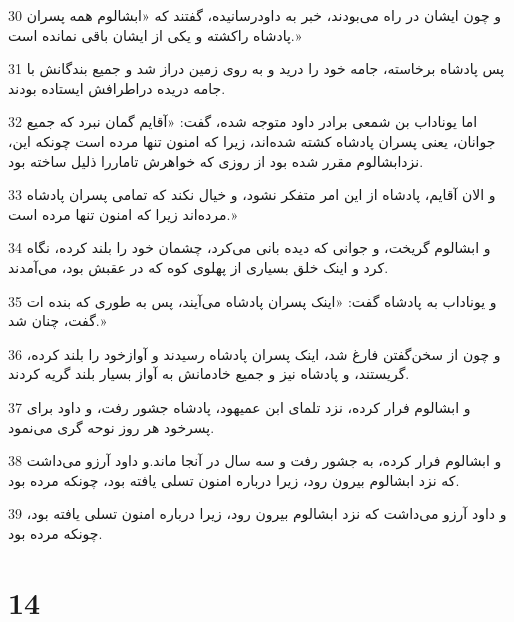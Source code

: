 \par 30 و چون ایشان در راه می‌بودند، خبر به داودرسانیده، گفتند که «ابشالوم همه پسران پادشاه راکشته و یکی از ایشان باقی نمانده است.»
\par 31 پس پادشاه برخاسته، جامه خود را درید و به روی زمین دراز شد و جمیع بندگانش با جامه دریده دراطرافش ایستاده بودند.
\par 32 اما یوناداب بن شمعی برادر داود متوجه شده، گفت: «آقایم گمان نبرد که جمیع جوانان، یعنی پسران پادشاه کشته شده‌اند، زیرا که امنون تنها مرده است چونکه این، نزدابشالوم مقرر شده بود از روزی که خواهرش تاماررا ذلیل ساخته بود.
\par 33 و الان آقایم، پادشاه از این امر متفکر نشود، و خیال نکند که تمامی پسران پادشاه مرده‌اند زیرا که امنون تنها مرده است.»
\par 34 و ابشالوم گریخت، و جوانی که دیده بانی می‌کرد، چشمان خود را بلند کرده، نگاه کرد و اینک خلق بسیاری از پهلوی کوه که در عقبش بود، می‌آمدند.
\par 35 و یوناداب به پادشاه گفت: «اینک پسران پادشاه می‌آیند، پس به طوری که بنده ات گفت، چنان شد.»
\par 36 و چون از سخن‌گفتن فارغ شد، اینک پسران پادشاه رسیدند و آوازخود را بلند کرده، گریستند، و پادشاه نیز و جمیع خادمانش به آواز بسیار بلند گریه کردند.
\par 37 و ابشالوم فرار کرده، نزد تلمای ابن عمیهود، پادشاه جشور رفت، و داود برای پسرخود هر روز نوحه گری می‌نمود.
\par 38 و ابشالوم فرار کرده، به جشور رفت و سه سال در آنجا ماند.و داود آرزو می‌داشت که نزد ابشالوم بیرون رود، زیرا درباره امنون تسلی یافته بود، چونکه مرده بود.
\par 39 و داود آرزو می‌داشت که نزد ابشالوم بیرون رود، زیرا درباره امنون تسلی یافته بود، چونکه مرده بود.
 
\chapter{14}


